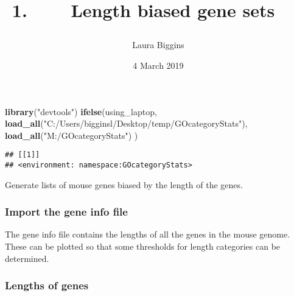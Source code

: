 \documentclass[]{article}
\title{\begin{enumerate}
\def\labelenumi{\arabic{enumi}.}
\tightlist
\item
  Length biased gene sets
\end{enumerate}}
\author{Laura Biggins}
\date{4 March 2019}
\newenvironment{Shaded}{\begin{snugshade}}{\end{snugshade}}
\newcommand{\KeywordTok}[1]{\textcolor[rgb]{0.13,0.29,0.53}{\textbf{#1}}}
\newcommand{\DataTypeTok}[1]{\textcolor[rgb]{0.13,0.29,0.53}{#1}}
\newcommand{\DecValTok}[1]{\textcolor[rgb]{0.00,0.00,0.81}{#1}}
\newcommand{\FloatTok}[1]{\textcolor[rgb]{0.00,0.00,0.81}{#1}}
\newcommand{\StringTok}[1]{\textcolor[rgb]{0.31,0.60,0.02}{#1}}
\newcommand{\OperatorTok}[1]{\textcolor[rgb]{0.81,0.36,0.00}{\textbf{#1}}}
\newcommand{\NormalTok}[1]{#1}
\begin{document}
\maketitle

\begin{Shaded}
\begin{Highlighting}[]
\KeywordTok{library}\NormalTok{(}\StringTok{"devtools"}\NormalTok{)}
\KeywordTok{ifelse}\NormalTok{(using_laptop,}
       \KeywordTok{load_all}\NormalTok{(}\StringTok{"C:/Users/bigginsl/Desktop/temp/GOcategoryStats"}\NormalTok{),}
       \KeywordTok{load_all}\NormalTok{(}\StringTok{"M:/GOcategoryStats"}\NormalTok{)}
\NormalTok{       )}
\end{Highlighting}
\end{Shaded}

\begin{verbatim}
## [[1]]
## <environment: namespace:GOcategoryStats>
\end{verbatim}

\begin{Shaded}
\end{Shaded}

Generate lists of mouse genes biased by the length of the genes.

\subsubsection{Import the gene info
file}\label{import-the-gene-info-file}

The gene info file contains the lengths of all the genes in the mouse
genome. These can be plotted so that some thresholds for length
categories can be determined.

\subsubsection{Lengths of genes}\label{lengths-of-genes}
\end{document}
